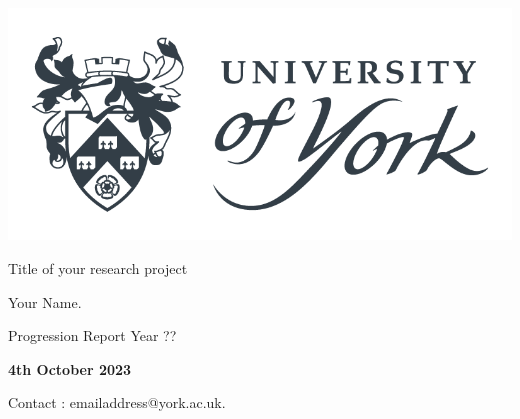 
\begin{titlepage}
	{\centering
	 \includegraphics[width=0.3\linewidth]{images/UOY-Logo-Stacked-shield-PMS432-2.png}\par\vspace{1cm}
 	{\Large{Title of your research project
 	}}\par\vspace{1cm}
Your Name. \par \vspace{0.5cm}
Progression Report Year ??\\

\par \vspace{5cm}
\textbf{4th October 2023} 
\par\vspace{5mm}
}

\centering 
\textsf{Contact : emailaddress@york.ac.uk.}\par \vspace{1cm}

\end{titlepage}